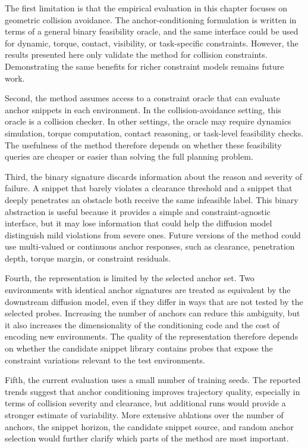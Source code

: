 The first limitation is that the empirical evaluation in this chapter focuses on geometric collision avoidance. The anchor-conditioning formulation is written in terms of a general binary feasibility oracle, and the same interface could be used for dynamic, torque, contact, visibility, or task-specific constraints. However, the results presented here only validate the method for collision constraints. Demonstrating the same benefits for richer constraint models remains future work.

Second, the method assumes access to a constraint oracle that can evaluate anchor snippets in each environment. In the collision-avoidance setting, this oracle is a collision checker. In other settings, the oracle may require dynamics simulation, torque computation, contact reasoning, or task-level feasibility checks. The usefulness of the method therefore depends on whether these feasibility queries are cheaper or easier than solving the full planning problem.

Third, the binary signature discards information about the reason and severity of failure. A snippet that barely violates a clearance threshold and a snippet that deeply penetrates an obstacle both receive the same infeasible label. This binary abstraction is useful because it provides a simple and constraint-agnostic interface, but it may lose information that could help the diffusion model distinguish mild violations from severe ones. Future versions of the method could use multi-valued or continuous anchor responses, such as clearance, penetration depth, torque margin, or constraint residuals.

Fourth, the representation is limited by the selected anchor set. Two environments with identical anchor signatures are treated as equivalent by the downstream diffusion model, even if they differ in ways that are not tested by the selected probes. Increasing the number of anchors can reduce this ambiguity, but it also increases the dimensionality of the conditioning code and the cost of encoding new environments. The quality of the representation therefore depends on whether the candidate snippet library contains probes that expose the constraint variations relevant to the test environments.

Fifth, the current evaluation uses a small number of training seeds. The reported trends suggest that anchor conditioning improves trajectory quality, especially in terms of collision severity and clearance, but additional runs would provide a stronger estimate of variability. More extensive ablations over the number of anchors, the snippet horizon, the candidate snippet source, and random anchor selection would further clarify which parts of the method are most important.

